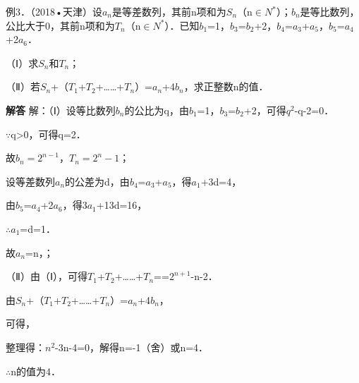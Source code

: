 例3．（2018•天津）设{\ensuremath{a_{n}}}是等差数列，其前n项和为\ensuremath{S_{n}}（n\ensuremath{\in}\ensuremath{N^*}）；{\ensuremath{b_{n}}}是等比数列，公比大于0，其前n项和为\ensuremath{T_{n}}（n\ensuremath{\in}\ensuremath{N^*}）．已知\ensuremath{b_{1}}=1，\ensuremath{b_{3}}=\ensuremath{b_{2}}+2，\ensuremath{b_{4}}=\ensuremath{a_{3}}+\ensuremath{a_{5}}，\ensuremath{b_{5}}=\ensuremath{a_{4}}+2\ensuremath{a_{6}}．\par
（Ⅰ）求\ensuremath{S_{n}}和\ensuremath{T_{n}}；\par
（Ⅱ）若\ensuremath{S_{n}}+（\ensuremath{T_{1}}+\ensuremath{T_{2}}+\ldots{}\ldots{}+\ensuremath{T_{n}}）=\ensuremath{a_{n}}+4\ensuremath{b_{n}}，求正整数n的值．\par
\QuestionSpace{4.8cm}
\ifshowanswers
\par\begingroup\color{solutioncolor}\noindent\textbf{解答}\quad
解：（Ⅰ）设等比数列{\ensuremath{b_{n}}}的公比为q，由\ensuremath{b_{1}}=1，\ensuremath{b_{3}}=\ensuremath{b_{2}}+2，可得\ensuremath{q^{2}}-q-2=0．\par
\ensuremath{\because}q>0，可得q=2．\par
故$b_n=2^{n-1}$，$T_n=2^n-1$；\par
设等差数列{\ensuremath{a_{n}}}的公差为d，由\ensuremath{b_{4}}=\ensuremath{a_{3}}+\ensuremath{a_{5}}，得\ensuremath{a_{1}}+3d=4，\par
由\ensuremath{b_{5}}=\ensuremath{a_{4}}+2\ensuremath{a_{6}}，得3\ensuremath{a_{1}}+13d=16，\par
\ensuremath{\therefore}\ensuremath{a_{1}}=d=1．\par
故\ensuremath{a_{n}}=n，；\par
（Ⅱ）由（Ⅰ），可得\ensuremath{T_{1}}+\ensuremath{T_{2}}+\ldots{}\ldots{}+\ensuremath{T_{n}}==\ensuremath{2^{n+1}}-n-2．\par
由\ensuremath{S_{n}}+（\ensuremath{T_{1}}+\ensuremath{T_{2}}+\ldots{}\ldots{}+\ensuremath{T_{n}}）=\ensuremath{a_{n}}+4\ensuremath{b_{n}}，\par
可得，\par
整理得：\ensuremath{n^{2}}-3n-4=0，解得n=-1（舍）或n=4．\par
\ensuremath{\therefore}n的值为4．\par
\par\endgroup\fi

